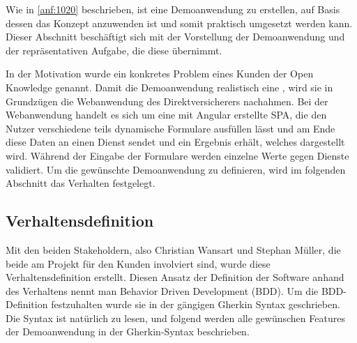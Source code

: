 
Wie in \autoref{anf:1020} beschrieben, ist eine Demoanwendung zu erstellen, auf Basis dessen das Konzept anzuwenden ist und somit praktisch umgesetzt werden kann. Dieser Abschnitt beschäftigt sich mit der Vorstellung der Demoanwendung und der repräsentativen Aufgabe, die diese übernimmt.

In der Motivation wurde ein konkretes Problem eines Kunden der Open Knowledge genannt. Damit die Demoanwendung realistisch eine , wird sie in Grundzügen die Webanwendung des Direktversicherers nachahmen. Bei der Webanwendung handelt es sich um eine mit Angular erstellte SPA, die den Nutzer verschiedene teils dynamische Formulare ausfüllen lässt und am Ende diese Daten an einen Dienst sendet und ein Ergebnis erhält, welches dargestellt wird. Während der Eingabe der Formulare werden einzelne Werte gegen Dienste validiert. Um die gewünschte Demoanwendung zu definieren, wird im folgenden Abschnitt das Verhalten festgelegt.

\subsection{Verhaltensdefinition}

Mit den beiden Stakeholdern, also Christian Wansart und Stephan Müller, die beide am Projekt für den Kunden involviert sind, wurde diese Verhaltensdefinition erstellt. Diesen Ansatz der Definition der Software anhand des Verhaltens nennt man Behavior Driven Development (BDD). Um die BDD-Definition festzuhalten wurde sie in der gängigen Gherkin \cite{Gherkin} Syntax geschrieben. Die Syntax ist natürlich zu lesen, und folgend werden alle gewünschen Features der Demoanwendung in der Gherkin-Syntax beschrieben.



